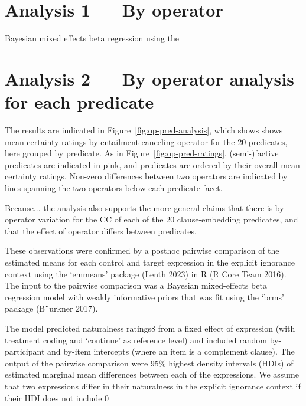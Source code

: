 \documentclass[11pt,fleqn]{article}
\newcommand{\6}{\mbox{$[\hspace*{-.6mm}[$}}
\newcommand{\9}{\mbox{$]\hspace*{-.6mm}]$}}
\begin{document}
\section{Analysis 1 --- By operator}

Bayesian mixed effects beta regression using the 

\section{Analysis 2 --- By operator analysis for each predicate}







The results are indicated in Figure~\ref{fig:op-pred-analysis}, which shows shows mean certainty ratings by entailment-canceling operator for the 20 predicates, here grouped by predicate. As in Figure~\ref{fig:op-pred-ratings}, (semi-)factive predicates are indicated in pink, and predicates are ordered by their overall mean certainty ratings. Non-zero differences between two operators are indicated by lines spanning the two operators below each predicate facet. 

Because...
the analysis also supports the more general claims that there is by-operator variation for the CC of each of the 20 clause-embedding predicates, and that the effect of operator differs between predicates.

These observations were confirmed by a posthoc pairwise comparison of the estimated means for each control and target expression in the explicit ignorance context using the ‘emmeans’ package (Lenth 2023) in R (R Core Team 2016). The input to the pairwise comparison was a Bayesian mixed-effects beta regression model with weakly informative priors that was fit using the ‘brms’ package (B¨urkner 2017).

The model predicted naturalness ratings8 from a fixed effect of expression (with treatment coding and ‘continue’ as reference level) and included random by-participant and by-item intercepts (where an item is a complement clause). The output of the pairwise comparison were 95\% highest density intervals (HDIs) of estimated
marginal mean differences between each of the expressions. We assume that two expressions differ in their naturalness in the explicit ignorance context if their HDI does not include 0
\end{document}
